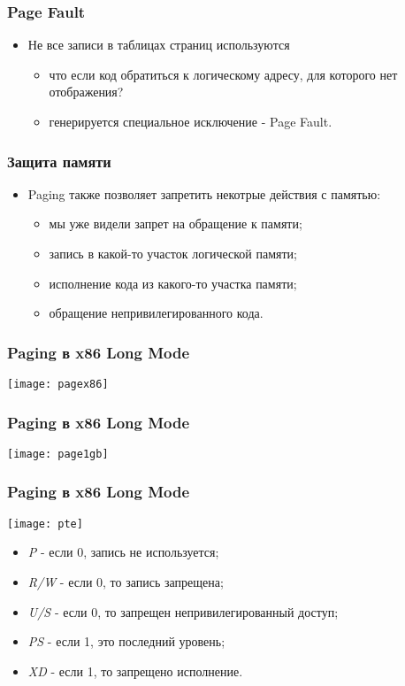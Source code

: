 \begin{frame}
\frametitle{Page Fault}
\begin{itemize}
    \item<1->Не все записи в таблицах страниц используются
    \begin{itemize}
        \item<1->что если код обратиться к логическому адресу, для которого нет
        отображения?
        \item<2->генерируется специальное исключение - Page Fault.
    \end{itemize}
\end{itemize}
\end{frame}

\begin{frame}
\frametitle{Защита памяти}
\begin{itemize}
    \item<1->Paging также позволяет запретить некотрые действия с памятью:
    \begin{itemize}
        \item<2->мы уже видели запрет на обращение к памяти;
        \item<3->запись в какой-то участок логической памяти;
        \item<4->исполнение кода из какого-то участка памяти;
        \item<5->обращение непривилегированного кода.
    \end{itemize}
\end{itemize}
\end{frame}

\begin{frame}
\frametitle{Paging в x86 Long Mode}
\texttt{[image: pagex86]}
\end{frame}

\begin{frame}
\frametitle{Paging в x86 Long Mode}
\texttt{[image: page1gb]}
\end{frame}

\begin{frame}
\frametitle{Paging в x86 Long Mode}
\texttt{[image: pte]}
\begin{itemize}
    \item\emph{P} - если 0, запись не используется;
    \item\emph{R/W} - если 0, то запись запрещена;
    \item\emph{U/S} - если 0, то запрещен непривилегированный доступ;
    \item\emph{PS} - если 1, это последний уровень;
    \item\emph{XD} - если 1, то запрещено исполнение.
\end{itemize}
\end{frame}


